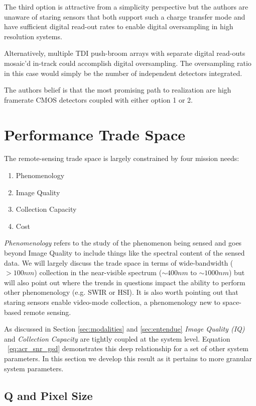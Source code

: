 \documentclass[]{spieman}  %
\begin{document}
The third option is attractive from a simplicity perspective but the authors are unaware of staring sensors that both support such a charge transfer mode and have sufficient digital read-out rates to enable digital oversampling in high resolution systems.

Alternatively, multiple TDI push-broom arrays with separate digital read-outs mosaic'd in-track could accomplish digital oversampling.  The oversampling ratio in this case would simply be the number of independent detectors integrated.

The authors belief is that the most promising path to realization are high framerate CMOS detectors coupled with either option 1 or 2.

\section{Performance Trade Space}
\label{sec:trade_space}

The remote-sensing trade space is largely constrained by four mission needs:

\begin{enumerate}
\item Phenomenology
\item Image Quality
\item Collection Capacity
\item Cost
\end{enumerate}

\emph{Phenomenology} refers to the study of the phenomenon being sensed and goes beyond Image Quality to include things like the spectral content of the sensed data.  We will largely discuss the trade space in terms of wide-bandwidth ($>100 nm$) collection in the near-visible spectrum ($\sim 400 nm$ to $\sim 1000 nm$) but will also point out where the trends in questions impact the ability to perform other phenomenology (e.g. SWIR or HSI).  It is also worth pointing out that staring sensors enable video-mode collection, a phenomenology new to space-based remote sensing.

As discussed in Section \ref{sec:modalities} and \ref{sec:entendue} \emph{Image Quality (IQ)} and \emph{Collection Capacity} are tightly coupled at the system level.  Equation ~\eqref{eq:acr_snr_gsd} demonstrates this deep relationship for a set of other system parameters.  In this section we develop this result as it pertains to more granular system parameters.  

\subsection{Q and Pixel Size}
\end{document}
